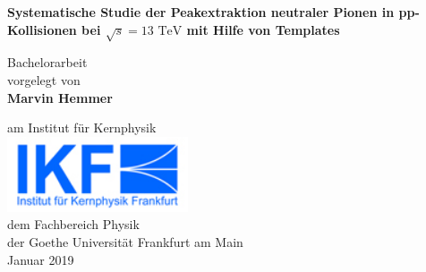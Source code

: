 \vspace*{1cm}
 
\Huge
\textbf{Systematische Studie der Peakextraktion neutraler Pionen in pp-Kollisionen bei $\sqrt{s}=13\text{ TeV}$ mit Hilfe von Templates}
 
\vspace{3.5cm}
\LARGE
Bachelorarbeit\\
vorgelegt von\\
\textbf{Marvin Hemmer}

\vfill
 
\Large
am Institut f\"ur Kernphysik\\
\includegraphics[width=0.4\textwidth]{IKF-Logokl}\\
dem Fachbereich Physik\\
der Goethe Universit\"at Frankfurt am Main\\
Januar 2019
 